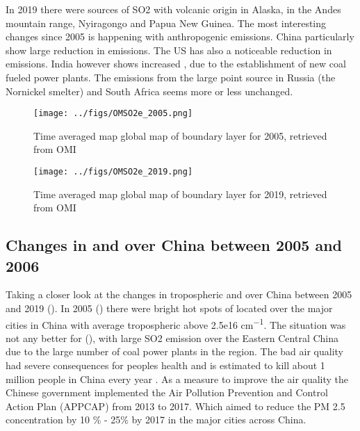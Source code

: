 In 2019  there were sources of SO2 with volcanic origin in 
Alaska, in  the Andes mountain range, Nyiragongo and Papua New Guinea. The most interesting 
changes since 2005 is happening with anthropogenic emissions. China particularly show large 
reduction in  emissions. The US has also a noticeable reduction in emissions. India 
however shows increased , due to the establishment of new coal fueled power plants. The 
emissions from the large point source in Russia (the Nornickel smelter) and South Africa 
seems more or less unchanged. 
\begin{figure}[htbp]
    \centering
        \texttt{[image: ../figs/OMSO2e\_2005.png]}
    \caption{Time averaged map global map of boundary layer  for 2005, retrieved from OMI}
    \label{fig:OMI_global_2005SO2}
\end{figure}

\begin{figure}[htbp]
    \centering
        \texttt{[image: ../figs/OMSO2e\_2019.png]}
    \caption{Time averaged map global map of boundary layer  for 2019, retrieved from OMI}
    \label{fig:OMI_global_2019SO2}
\end{figure}

\subsection*{Changes in  and  over China between 2005 and 2006}

Taking a closer look at the changes in tropospheric  and  over China
between 2005 and 2019 (). In 2005 ()
there were bright hot spots of  located
over the major cities in China with average tropospheric
 above 2.5e16 \si{cm^{-1}}. The situation was not any better for  (), with large \ch
{SO2} emission over the Eastern Central China due to the large number of coal power plants in 
the region. The bad air quality had severe consequences 
for peoples health and is estimated to kill about 1 million people in 
China every year \parencite{yue2020stronger}. As a measure to improve the 
air quality the Chinese government implemented the Air Pollution 
Prevention and Control Action Plan (APPCAP) from 2013 to 2017. Which 
aimed to reduce the PM 2.5 concentration by 10 \% - 25\% by 2017 in the major cities across China.      

